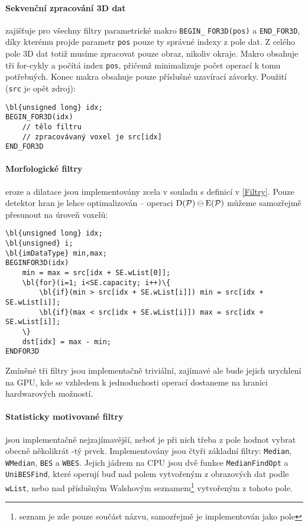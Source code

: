         \paragraph{Sekvenční zpracování 3D dat} zajišťuje pro všechny filtry parametrické makro {\tt BEGIN\_} {\tt FOR3D(pos)} a {\tt END\_FOR3D}, díky kterému projde parametr {\tt pos} pouze ty správné indexy z pole dat. Z celého pole 3D dat totiž musíme zpracovat pouze obraz, nikoliv okraje. Makro obsahuje tři for-cykly a počítá index {\tt pos}, přičemž minimalizuje počet operací k tomu potřebných. Konec makra obsahuje pouze příslušné uzavírací závorky. Použití ({\tt src} je opět zdroj):

        \begin{Verbatim}[commandchars = \\\{\}]
\bl{unsigned long} idx;
BEGIN_FOR3D(idx)
    // tělo filtru
    // zpracovávaný voxel je src[idx]
END_FOR3D
        \end{Verbatim}

        \paragraph{Morfologické filtry} eroze a dilatace jsou implementovány zcela v souladu s definicí v \ref{Filtry}. Pouze detektor hran je lehce optimalizován -- operaci $\mathrm{D}(\mathcal{P}) \ominus \mathrm{E}(\mathcal{P})$ můžeme samozřejmě přesunout na úroveň voxelů:

        \begin{Verbatim}[commandchars = \\\{\}]
\bl{unsigned long} idx;
\bl{unsigned} i;
\bl{imDataType} min,max;
BEGINFOR3D(idx)
    min = max = src[idx + SE.wList[0]];
    \bl{for}(i=1; i<SE.capacity; i++)\{
        \bl{if}(min > src[idx + SE.wList[i]]) min = src[idx + SE.wList[i]];
        \bl{if}(max < src[idx + SE.wList[i]]) max = src[idx + SE.wList[i]];
    \}
    dst[idx] = max - min;
ENDFOR3D
        \end{Verbatim}

        Zmíněné tři filtry jsou implementačně triviální, zajímavé ale bude jejich urychlení na GPU, kde se vzhledem k jednoduchosti operací dostaneme na hranici hardwarových možností.

        \paragraph{Statisticky motivované filtry} jsou implementačně nejzajímavější, neboť je při nich třeba z pole hodnot vybrat obecně několikrát \kk-tý prvek. Implementovány jsou čtyři základní filtry: {\tt Median}, {\tt WMedian}, {\tt BES} a {\tt WBES}. Jejich jádrem na CPU jsou dvě funkce {\tt MedianFindOpt} a {\tt UniBESFind}, které operují buď nad polem vytvořeným z obrazových dat podle {\tt wList}, nebo nad příslušným Walshovým seznamem\footnote{seznam je zde pouze součást názvu, samozřejmě je implementován jako pole} vytvořeným z tohoto pole.

